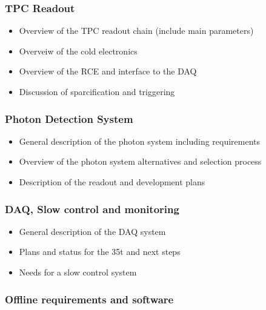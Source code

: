 \subsubsection{TPC Readout}
\begin{itemize}
\item Overview of the TPC readout chain (include main parameters)
\item Overveiw of the cold electronics
\item Overview of the RCE and interface to the DAQ
\item	Discussion of sparcification and triggering
\end{itemize}

\subsubsection{Photon Detection System}
\begin{itemize}
\item General description of the photon system including requirements
\item Overview of the photon system alternatives and selection process
\item Description of the readout and development plans
\end{itemize}

\subsubsection{DAQ, Slow control and monitoring}
\begin{itemize}
\item General description of the DAQ system
\item Plans and status for the 35t and next steps
\item Needs for a slow control system
\end{itemize}

\subsubsection{Offline requirements and software}




